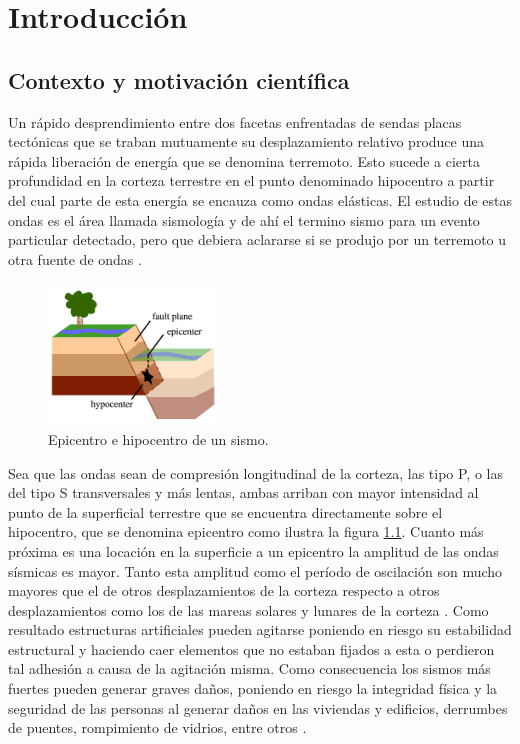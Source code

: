 \documentclass[a4paper]{report}
\begin{document}
\tableofcontents


\chapter{Introducción}

\section{Contexto y motivación científica}\label{sec:contexto}

Un rápido desprendimiento entre dos facetas enfrentadas de sendas placas tectónicas que se traban mutuamente su desplazamiento relativo produce una rápida liberación de energía que se denomina terremoto.
Esto sucede a cierta profundidad en la corteza terrestre en el punto denominado hipocentro a partir del cual parte de esta energía se encauza como ondas elásticas.
El estudio de estas ondas es el área llamada sismología y de ahí el termino sismo para un evento particular detectado, pero que debiera aclararse si se produjo por un terremoto u otra fuente de ondas \cite[sección 4.1.1]{fowler_solid_1990}.
\begin{figure}
  \centering
	\includegraphics[width=0.4\textwidth]{eq-ed-fault-labeled.png}
	\caption{Epicentro e hipocentro de un sismo.}
	\label{fig:epicentro_hipocentro}
\end{figure}
Sea que las ondas sean de compresión longitudinal de la corteza, las tipo P, o las del tipo S transversales y más lentas, ambas arriban con mayor intensidad al punto de la superficial terrestre que se encuentra directamente sobre el hipocentro, que se denomina epicentro \cite[sección 4.1.2]{fowler_solid_1990} como ilustra la figura \ref{fig:epicentro_hipocentro}.
Cuanto más próxima es una locación en la superficie a un epicentro la amplitud de las ondas sísmicas es mayor.
Tanto esta amplitud como el período de oscilación son mucho mayores que el de otros desplazamientos de la corteza respecto a otros desplazamientos como los de las mareas solares y lunares de la corteza \cite[sección 4.1.4]{fowler_solid_1990}.
Como resultado estructuras artificiales pueden agitarse poniendo en riesgo su estabilidad estructural y haciendo caer elementos que no estaban fijados a esta o perdieron tal adhesión a causa de la agitación misma.
Como consecuencia los sismos más fuertes pueden generar graves daños, poniendo en riesgo la integridad física y la seguridad de las personas al generar daños en las viviendas y edificios, derrumbes de puentes, rompimiento de vidrios, entre otros \cite{noauthor_que_2018}.
\end{document}
